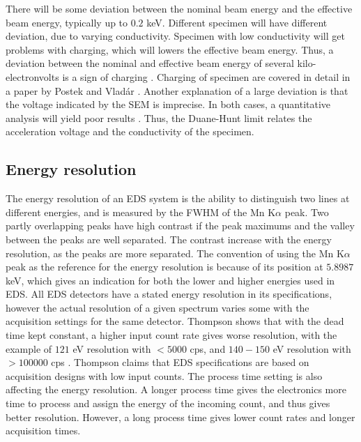 There will be some deviation between the nominal beam energy and the effective beam energy, typically up to $0.2$ keV.
Different specimen will have different deviation, due to varying conductivity.
Specimen with low conductivity will get problems with charging, which will lowers the effective beam energy.
Thus, a deviation between the nominal and effective beam energy of several kilo-electronvolts is a sign of charging \cite{dtsaii_2_manipulating_spectra}.
Charging of specimen are covered in detail in a paper by Postek and Vladár \cite{postek_charging_2015}.
Another explanation of a large deviation is that the voltage indicated by the SEM is imprecise.
In both cases, a quantitative analysis will yield poor results \cite{iso_quantification_22309}.
Thus, the Duane-Hunt limit relates the acceleration voltage and the conductivity of the specimen.








\subsection{Energy resolution}
\label{theory:eds_performance:energyres}


The energy resolution of an EDS system is the ability to distinguish two lines at different energies, and is measured by the FWHM of the Mn K$\alpha$ peak.
Two partly overlapping peaks have high contrast if the peak maximums and the valley between the peaks are well separated.
The contrast increase with the energy resolution, as the peaks are more separated.
The convention of using the Mn K$\alpha$ peak as the reference for the energy resolution is because of its position at $5.8987$ keV, which gives an indication for both the lower and higher energies used in EDS.
All EDS detectors have a stated energy resolution in its specifications, however the actual resolution of a given spectrum varies some with the acquisition settings for the same detector.
Thompson shows that with the dead time kept constant, a higher input count rate gives worse resolution, with the example of $121$ eV resolution with $<5000$ cps, and $140-150$ eV resolution with $>100000$ cps \cite{keith_energy_res_2013}.
Thompson claims that EDS specifications are based on acquisition designs with low input counts.
The process time setting is also affecting the energy resolution.
A longer process time gives the electronics more time to process and assign the energy of the incoming count, and thus gives better resolution.
However, a long process time gives lower count rates and longer acquisition times.


